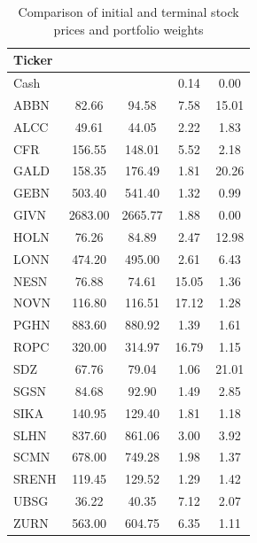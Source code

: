 \begin{table}[!htbp]
    \centering
    \small
    \renewcommand{\arraystretch}{0.95}
    \setlength{\tabcolsep}{4pt}

    \begin{adjustbox}{max width=\textwidth, max totalheight=0.85\textheight}
    \begin{tabular}{
        l
        S[table-format=4.2]
        S[table-format=4.2]
        S[table-format=2.2]
        S[table-format=2.2]
    }
        \toprule
        {Ticker}
        & {}
        & {}
        & {}
        & {} \\
        \midrule
        Cash  &  &  & 0.14 & 0.00 \\
        ABBN  & 82.66   & 94.58   & 7.58  & 15.01 \\
        ALCC  & 49.61   & 44.05   & 2.22  & 1.83 \\
        CFR   & 156.55  & 148.01  & 5.52  & 2.18 \\
        GALD  & 158.35  & 176.49  & 1.81  & 20.26 \\
        GEBN  & 503.40  & 541.40  & 1.32  & 0.99 \\
        GIVN  & 2683.00 & 2665.77 & 1.88  & 0.00 \\
        HOLN  & 76.26   & 84.89   & 2.47  & 12.98 \\
        LONN  & 474.20  & 495.00  & 2.61  & 6.43 \\
        NESN  & 76.88   & 74.61   & 15.05 & 1.36 \\
        NOVN  & 116.80  & 116.51  & 17.12 & 1.28 \\
        PGHN  & 883.60  & 880.92  & 1.39  & 1.61 \\
        ROPC  & 320.00  & 314.97  & 16.79 & 1.15 \\
        SDZ   & 67.76   & 79.04   & 1.06  & 21.01 \\
        SGSN  & 84.68   & 92.90   & 1.49  & 2.85 \\
        SIKA  & 140.95  & 129.40  & 1.81  & 1.18 \\
        SLHN  & 837.60  & 861.06  & 3.00  & 3.92 \\
        SCMN  & 678.00  & 749.28  & 1.98  & 1.37 \\
        SRENH & 119.45  & 129.52  & 1.29  & 1.42 \\
        UBSG  & 36.22   & 40.35   & 7.12  & 2.07 \\
        ZURN  & 563.00  & 604.75  & 6.35  & 1.11 \\
        \bottomrule
    \end{tabular}
    \end{adjustbox}

    \caption{Comparison of initial and terminal stock prices and portfolio weights}
    \label{tab: initial vs terminal portfolio weights}
\end{table}

